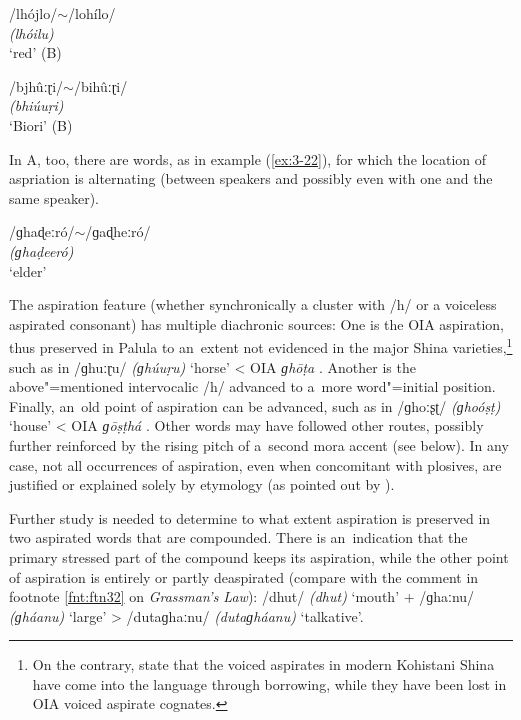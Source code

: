 \begin{exe}
\extab
\label{ex:3-20}
/lhójlo/$\sim$/lohílo/ \\
\textit{(lhóilu)} \\
`red' (B)

\extab
\label{ex:3-21}
/bjhûːɽi/$\sim$/bihûːɽi/ \\
\textit{(bhiúuṛi)} \\
`Biori' (B)
\end{exe}

In A, too, there are words, as in example (\ref{ex:3-22}), for which the location of aspriation is alternating (between speakers and possibly even with one and the same speaker).

\begin{exe}
\extab
\label{ex:3-22}
/ɡhaɖeːró/$\sim$/ɡaɖheːró/ \\
\textit{(ɡhaḍeeró)} \\
`elder'
\end{exe}

The aspiration feature (whether synchronically a cluster with /h/ or a voiceless aspirated consonant) has multiple diachronic sources: One is the OIA aspiration, thus preserved in Palula to an~extent not evidenced in the major Shina varieties,\footnote{On the contrary, \citet[30]{schmidtkohistani2008} state that the voiced aspirates in modern Kohistani Shina have come into the language through borrowing, while they have been lost in OIA voiced aspirate cognates.} such as in /ɡhuːɽu/ \textit{(ɡhúuṛu)} `horse' {\textless} OIA \textit{ɡhōṭa} \citep[4516]{turner1966}. Another is the above"=mentioned intervocalic /h/ advanced to a~more word"=initial position. Finally, an~old point of aspiration can be advanced, such as in /ɡhoːʂʈ/ \textit{(ɡhoóṣṭ)} `house' {\textless} OIA \textit{ɡōṣṭhá} \citep[4336]{turner1966}. Other words may have followed other routes, possibly further reinforced by the rising pitch of a~second mora accent (see  below). In any case, not all occurrences of aspiration, even when concomitant with plosives, are justified or explained solely by etymology (as pointed out by \citealt[57]{morgenstierne1932}).


Further study is needed to determine to what extent aspiration is preserved in two aspirated words that are compounded. There is an~indication that the primary stressed part of the compound keeps its aspiration, while the other point of aspiration is entirely or partly deaspirated (compare with the comment in footnote \ref{fnt:ftn32} on \textit{Grassman's Law}): /dhut/ \textit{(dhut)} `mouth' + /ɡhaːnu/ \textit{(ɡháanu)} `large' {\textgreater} /dutaɡhaːnu/ \textit{(dutaɡháanu)} `talkative'.


